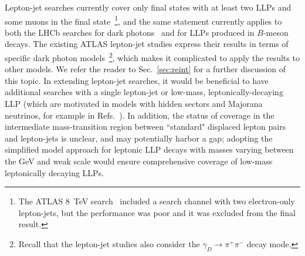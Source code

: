 {Lepton-jet searches currently cover only final states with at least two LLPs and some muons in the final state~\footnote{The ATLAS 8~TeV search~\cite{Aad:2014yea} included a search channel with two electron-only lepton-jets, but the performance was poor and it was excluded from the final result.}, and the same statement currently applies to both the LHCb searches for dark photons~\cite{Aaij:2016rxn,Aaij:2017rft} and for LLPs produced in $B$-meson decays. The existing ATLAS lepton-jet studies express their results in terms of specific dark photon models~\footnote{Recall that the lepton-jet studies also consider the $\gamma_D \to \pi^+ \pi^-$ decay mode.}, which makes it complicated to apply the results to other models. We refer the reader to Sec.~\ref{sec:reint} for a further discussion of this topic. In extending lepton-jet searches, it would be beneficial to have additional searches with a single lepton-jet or low-mass, leptonically-decaying LLP (which are motivated in models with hidden sectors and Majorana neutrinos, for example in Refs.~\cite{Izaguirre:2015pga,Izaguirre:2015zva}). In addition, the status of coverage in the intermediate mass-transition region between ``standard" displaced lepton pairs and lepton-jets is unclear, and may potentially harbor a gap; adopting the simplified model approach for leptonic LLP decays with masses varying between the GeV and weak scale would ensure comprehensive coverage of low-mass leptonically decaying LLPs.

}
